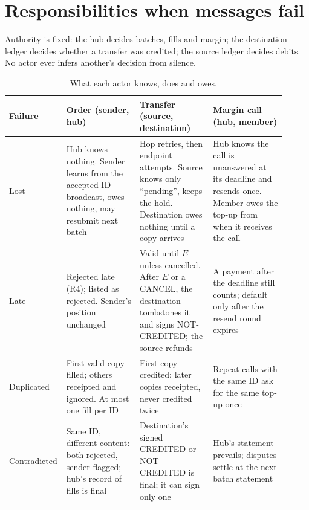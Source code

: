 \documentclass[11pt]{article}
\theoremstyle{definition}
\theoremstyle{remark}
\begin{document}
\section{Responsibilities when messages fail}\label{sec:fail}
Authority is fixed: the hub decides batches, fills and margin; the destination ledger decides whether a transfer was credited; the source ledger decides debits. No actor ever infers another's decision from silence.
\begin{table}[H]
\centering
\caption{What each actor knows, does and owes.}\label{tab:fail}
\small
\begin{tabular}{@{}p{0.13\linewidth}p{0.26\linewidth}p{0.26\linewidth}p{0.26\linewidth}@{}}
\toprule
Failure & Order (sender, hub) & Transfer (source, destination) & Margin call (hub, member) \\
\midrule
Lost & Hub knows nothing. Sender learns from the accepted-ID broadcast, owes nothing, may resubmit next batch & Hop retries, then endpoint attempts. Source knows only ``pending'', keeps the hold. Destination owes nothing until a copy arrives & Hub knows the call is unanswered at its deadline and resends once. Member owes the top-up from when it receives the call \\
Late & Rejected late (R4); listed as rejected. Sender's position unchanged & Valid until $E$ unless cancelled. After $E$ or a CANCEL, the destination tombstones it and signs NOT-CREDITED; the source refunds & A payment after the deadline still counts; default only after the resend round expires \\
Duplicated & First valid copy filled; others receipted and ignored. At most one fill per ID & First copy credited; later copies receipted, never credited twice & Repeat calls with the same ID ask for the same top-up once \\
Contradicted & Same ID, different content: both rejected, sender flagged; hub's record of fills is final & Destination's signed CREDITED or NOT-CREDITED is final; it can sign only one & Hub's statement prevails; disputes settle at the next batch statement \\
\bottomrule
\end{tabular}
\end{table}
\vspace{-6pt}
\end{document}
